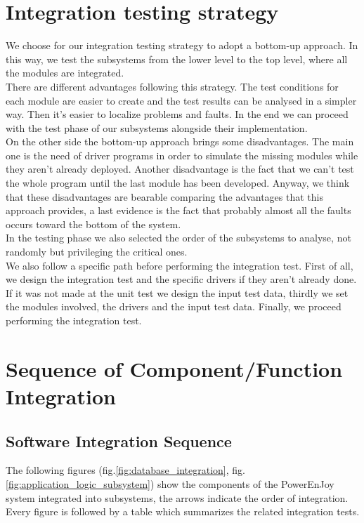 \section{Integration testing strategy}
We choose for our integration testing strategy to adopt a bottom-up approach. In this way, we test the subsystems from the lower level to the top level, where all the modules are integrated. 
\\There are different advantages following this strategy. The test conditions for each module are easier to create and the test results can be analysed in a simpler way. Then it's easier to localize problems and faults. In the end we can proceed with the test phase of our subsystems alongside their implementation.
\\On the other side the bottom-up approach brings some disadvantages. The main one is the need of driver programs in order to simulate the missing modules while they aren't already deployed. Another disadvantage is the fact that we can't test the whole program until the last module has been developed. Anyway, we think that these disadvantages are bearable comparing the advantages that this approach provides, a last evidence is the fact that probably almost all the faults occurs toward the bottom of the system.
\\In the testing phase we also selected the order of the subsystems to analyse, not randomly but privileging the critical ones.
\\ We also follow a specific path before performing the integration test. First of all, we design the integration test and the specific drivers if they aren't already done. If it was not made at the unit test we design the input test data, thirdly we set the modules involved, the drivers and the input test data. Finally, we proceed performing the integration test.

\newpage
\section{Sequence of Component/Function Integration} \label{sec:integration_sequence}

	\subsection{Software Integration Sequence}{}
	The following figures (fig.\ref{fig:database_integration}, fig.\ref{fig:application_logic_subsystem}) show the components of the PowerEnJoy system integrated into subsystems, the arrows indicate the order of integration. Every figure is followed by a table which summarizes the related integration tests.

